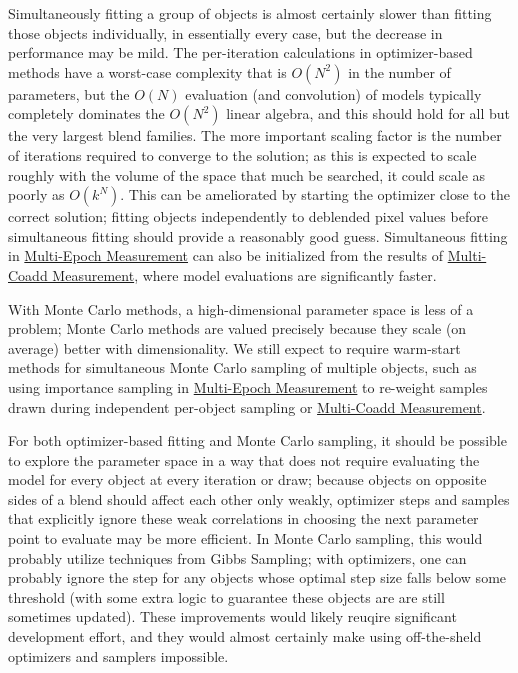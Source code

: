 Simultaneously fitting a group of objects is almost certainly slower than fitting those objects individually, in essentially every case, but the decrease in performance may be mild.  The per-iteration calculations in optimizer-based methods have a worst-case complexity that is $O(N^2)$ in the number of parameters, but the $O(N)$ evaluation (and convolution) of models typically completely dominates the $O(N^2)$ linear algebra, and this should hold for all but the very largest blend families.  The more important scaling factor is the number of iterations required to converge to the solution; as this is expected to scale roughly with the volume of the space that much be searched, it could scale as poorly as $O(k^N)$.  This can be ameliorated by starting the optimizer close to the correct solution; fitting objects independently to deblended pixel values before simultaneous fitting should provide a reasonably good guess.  Simultaneous fitting in \hyperref[sec:acMultiEpochMeasurement]{Multi-Epoch Measurement} can also be initialized from the results of \hyperref[sec:acMultiCoaddMeasurement]{Multi-Coadd Measurement}, where model evaluations are significantly faster.

With Monte Carlo methods, a high-dimensional parameter space is less of a problem; Monte Carlo methods are valued precisely because they scale (on average) better with dimensionality.  We still expect to require warm-start methods for simultaneous Monte Carlo sampling of multiple objects, such as using importance sampling in \hyperref[sec:acMultiEpochMeasurement]{Multi-Epoch Measurement} to re-weight samples drawn during independent per-object sampling or \hyperref[sec:acMultiCoaddMeasurement]{Multi-Coadd Measurement}.

For both optimizer-based fitting and Monte Carlo sampling, it should be possible to explore the parameter space in a way that does not require evaluating the model for every object at every iteration or draw; because objects on opposite sides of a blend should affect each other only weakly, optimizer steps and samples that explicitly ignore these weak correlations in choosing the next parameter point to evaluate may be more efficient.  In Monte Carlo sampling, this would probably utilize techniques from Gibbs Sampling; with optimizers, one can probably ignore the step for any objects whose optimal step size falls below some threshold (with some extra logic to guarantee these objects are are still sometimes updated).  These improvements would likely reuqire significant development effort, and they would almost certainly make using off-the-sheld optimizers and samplers impossible.

